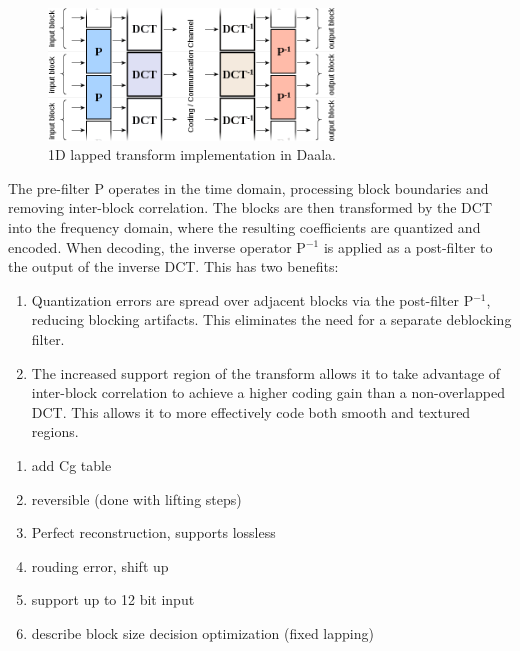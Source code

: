 \documentclass[conference, 10pt]{IEEEtran}
\begin{document}
\begin{figure}[h]
\begin{center}
\noindent
  \includegraphics[natwidth=876,natheight=314,width=3in]{lapping.png}
  \caption{1D lapped transform implementation in Daala.}\label{fig:bands}
\end{center}
\end{figure}

The pre-filter P operates in the time domain, processing block boundaries and
 removing inter-block correlation.
The blocks are then transformed by the DCT into the frequency domain, where
 the resulting coefficients are quantized and encoded.
When decoding, the inverse operator P$^{-1}$ is applied as a post-filter to
 the output of the inverse DCT.
This has two benefits:

\begin{enumerate}
\item Quantization errors are spread over adjacent blocks via the post-filter
 P$^{-1}$, reducing blocking artifacts.
This eliminates the need for a separate deblocking filter.
\item The increased support region of the transform allows it to take
 advantage of inter-block correlation to achieve a higher coding gain than a
 non-overlapped DCT.  This allows it to more effectively code both smooth and
 textured regions.
\end{enumerate}

\begin{enumerate}
\item add Cg table
\item reversible (done with lifting steps)
\item Perfect reconstruction, supports lossless
\item rouding error, shift up
\item support up to 12 bit input
\item describe block size decision optimization (fixed lapping)
\end{enumerate}

\end{document}
